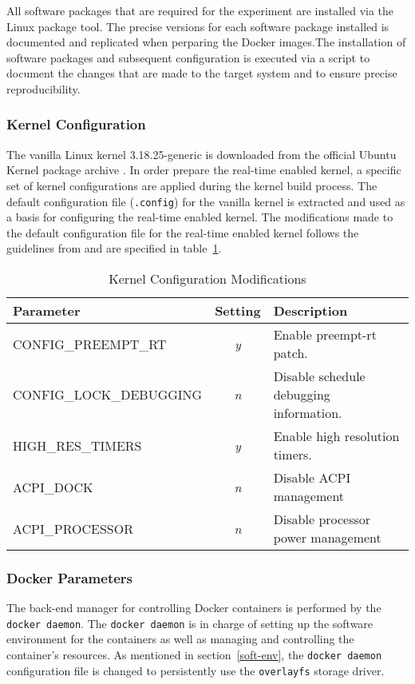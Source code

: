 All software packages that are required for the experiment are installed via the Linux package tool. The precise versions for each software package installed is documented and replicated when perparing the Docker images.The installation of software packages and subsequent configuration is executed via a script to document the changes that are made to the target system and to ensure precise reproducibility.

\subsubsection{Kernel Configuration} 
The vanilla Linux kernel 3.18.25-generic is downloaded from the official Ubuntu Kernel package archive \cite{kernel}. In order prepare the real-time enabled kernel, a specific set of kernel configurations are applied during the kernel build process. The default configuration file (\texttt{.config}) for the vanilla kernel is extracted and used as a basis for configuring the real-time enabled kernel. The modifications made to the default configuration file for the real-time enabled kernel follows the guidelines from \cite{rt-howto} and are specified in table~\ref{kernel-config}.  

\begin{table}[ht]
\begin{tabular}{|l|c|l|}
\hline
Parameter             		& \multicolumn{1}{l|}{Setting} & Description \\ \hline
CONFIG\_PREEMPT\_RT   		& \textit{y}                   & Enable preempt-rt patch.            \\ \hline
CONFIG\_LOCK\_DEBUGGING 	& \textit{n}                   & Disable schedule debugging information.            \\ \hline
HIGH\_RES\_TIMERS 			& \textit{y}				   & Enable high resolution timers. \\ \hline
ACPI\_DOCK					& \textit{n}				   & Disable ACPI management \\ \hline
ACPI\_PROCESSOR				& \textit{n}				   & Disable processor power management \\ \hline
\end{tabular}
\centering
\caption{Kernel Configuration Modifications}
\label{kernel-config}
\end{table}

\subsubsection{Docker Parameters}
The back-end manager for controlling Docker containers is performed by the \texttt{docker daemon}. The \texttt{docker daemon} is in charge of setting up the software environment for the containers as well as managing and controlling the container's resources. As mentioned in section~\ref{soft-env}, the \texttt{docker daemon} configuration file is changed to persistently use the \texttt{overlayfs} storage driver.\\

